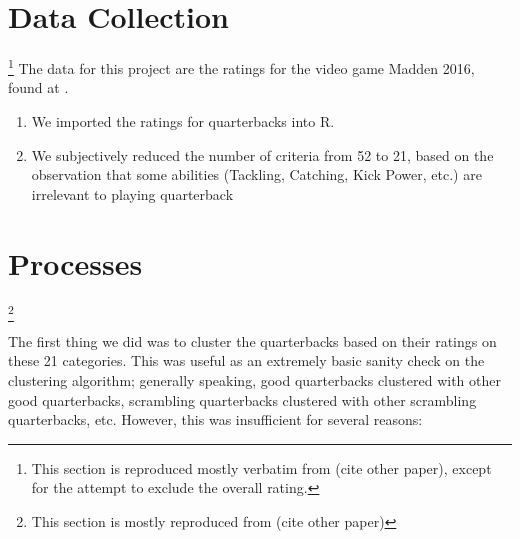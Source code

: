 \documentclass[12pt]{article}
\begin{document}
\section{Data Collection}\footnote{This section is reproduced mostly verbatim from (cite other paper), except for the attempt to exclude the overall rating.}
The data for this project are the ratings for the video game Madden 2016, found at \cite{spreadsheet}. 
\begin{enumerate}
	\item We imported the ratings for quarterbacks into R.
	\item We subjectively reduced the number of criteria from 52 to 21, based on the observation that some abilities (Tackling, Catching, Kick Power, etc.) are irrelevant to playing quarterback
\end{enumerate}

\section{Processes}\footnote{This section is mostly reproduced from (cite other paper)}

The first thing we did was to cluster the quarterbacks based on their ratings on these 21 categories. This was useful as an extremely basic sanity check on the clustering algorithm; generally speaking, good quarterbacks clustered with other good quarterbacks, scrambling quarterbacks clustered with other scrambling quarterbacks, etc. However, this was insufficient for several reasons:
\end{document}
